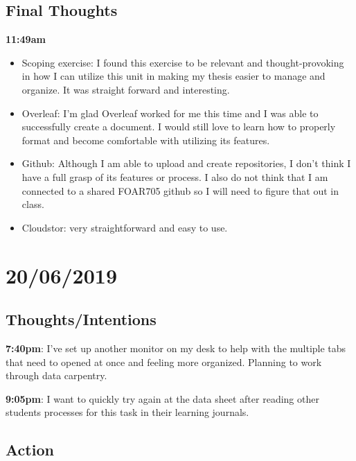 \documentclass{article}
\begin{document}
\subsection{Final Thoughts}

\textbf{11:49am}

\begin{itemize}
\item Scoping exercise: I found this exercise to be relevant and thought-provoking in how I can utilize this unit in making my thesis easier to manage and organize. It was straight forward and interesting. 
\item Overleaf: I’m glad Overleaf worked for me this time and I was able to successfully create a document. I would still love to learn how to properly format and become comfortable with utilizing its features. 
\item Github: Although I am able to upload and create repositories, I don’t think I have a full grasp of its features or process. I also do not think that I am connected to a shared FOAR705 github so I will need to figure that out in class.
\item Cloudstor: very straightforward and easy to use.
\end{itemize}

\section{20/06/2019}
\subsection{Thoughts/Intentions}
\textbf{7:40pm}:  I've set up another monitor on my desk to help with the multiple tabs that need to opened at once and feeling more organized. Planning to work through data carpentry.

\textbf{9:05pm}: I want to quickly try again at the data sheet after reading other students processes for this task in their learning journals. 

\subsection{Action}
\end{document}
